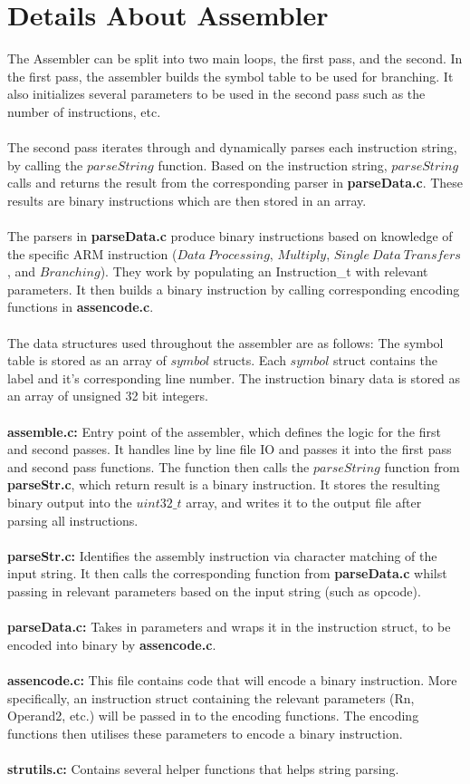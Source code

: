 \documentclass[a4paper]{article}
\begin{document}
\section{Details About Assembler}
The Assembler can be split into two main loops, the first pass, and the second. In the first pass, the assembler builds the symbol table to be used for branching. It also initializes several parameters to be used in the second pass such as the number of instructions, etc.
\\\\
The second pass iterates through and dynamically parses each instruction string, by calling the $parseString$ function. Based on the instruction string, $parseString$ calls and returns the result from the corresponding parser in \textbf{parseData.c}. These results are binary instructions which are then stored in an array.
\\\\
The parsers in \textbf{parseData.c} produce binary instructions based on knowledge of the specific ARM instruction ($Data\ Processing$, $Multiply$, $Single\ Data\ Transfers$, and $Branching$). They work by populating an Instruction\_t with relevant parameters. It then builds a binary instruction by calling corresponding encoding functions in \textbf{assencode.c}.
\\\\
The data structures used throughout the assembler are as follows: The symbol table is stored as an array of $symbol$ structs. Each $symbol$ struct contains the label and it's corresponding line number. The instruction binary data is stored as an array of unsigned 32 bit integers.
\\\\
\textbf{assemble.c:} Entry point of the assembler, which defines the logic for the first and second passes. It handles line by line file IO and passes it into the first pass and second pass functions. The function then calls the $parseString$ function from \textbf{parseStr.c}, which return result is a binary instruction. It stores the resulting binary output into the $uint32\_t$ array, and writes it to the output file after parsing all instructions.
\\\\
\textbf{parseStr.c:} Identifies the assembly instruction via character matching of the input string. It then calls the corresponding function from \textbf{parseData.c} whilst passing in relevant parameters based on the input string (such as opcode).
\\\\
\textbf{parseData.c:} Takes in parameters and wraps it in the instruction struct, to be encoded into binary by \textbf{assencode.c}.
\\\\
\textbf{assencode.c:} This file contains code that will encode a binary instruction. More specifically, an instruction struct containing the relevant parameters (Rn, Operand2, etc.) will be passed in to the encoding functions. The encoding functions then utilises these parameters to encode a binary instruction.
\\\\
\textbf{strutils.c:} Contains several helper functions that helps string parsing. 
\end{document}
